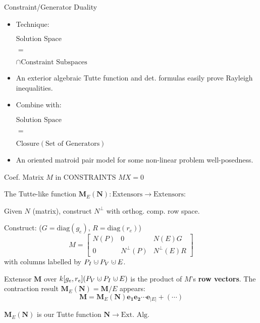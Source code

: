 \documentclass{beamer}
\newcommand{\dunion}
{\mbox{\hbox{\hskip0.45em$\cdot$\hskip-0.44em$\cup$\hskip0.2em}}}
\begin{document}
\begin{frame}{Constraint/Generator Duality}
\begin{minipage}{0.48\textwidth}

\begin{itemize}
\item
Technique:
\begin{center}$\text{Solution Space}$\end{center}
\begin{center}$=$\end{center}
\begin{center}$\cap \text{Constraint Subspaces}$\end{center}
\item
An
exterior algebraic Tutte function
and det. formulas
easily prove Rayleigh inequalities.
\end{itemize}

\end{minipage}
\begin{minipage}{0.48\textwidth}

\begin{itemize}
\item
Combine with:
\begin{center}$\text{Solution Space}$ \end{center}
\begin{center}$=$ \end{center}
\begin{center}$\text{Closure}(\text{Set of Generators})$\end{center}
\item
An oriented matroid pair model
for some non-linear problem
well-posedness.
\end{itemize}
\end{minipage}
\end{frame}

\begin{frame}
{Coef. Matrix $M$ in CONSTRAINTS $MX=0$}
\begin{center}
The Tutte-like function $\mathbf{M}_E(\mathbf{N}):\text{Extensors}\rightarrow\text{Extensors}$:
\end{center}

Given $N$ (matrix), construct $N^\perp$ 
with orthog. comp. row space.

Construct:  ($G=\mbox{diag}(g_e)$, $R=\mbox{diag}(r_e)$)
\[
M = \left[\begin{array}{c|c|c} N(P)  &  0  &  N(E)G \\  \hline
0  & N^{\perp}(P)  &  N^{\perp}(E)R \end{array}\right]
\]
with columns labelled by $P_I\dunion P_V\dunion E$.

Extensor $\mathbf{M}$ over $k[g_e, r_e](P_V\dunion P_I \dunion E)$
is the product of $M$'s \textbf{row vectors}. The contraction result
$\mathbf{M}_E(\mathbf{N}) = \mathbf{M}/E$ appears:
\[
\mathbf{M} = \mathbf{M}_E(\mathbf{N})\mathbf{e_1}\mathbf{e_2}\cdots\mathbf{e}_{|E|} + (\cdots) 
\]

$\mathbf{M}_E(\mathbf{N})$ is our Tutte function $\mathbf{N}\rightarrow \text{Ext. Alg.}$
\end{frame}
\end{document}
